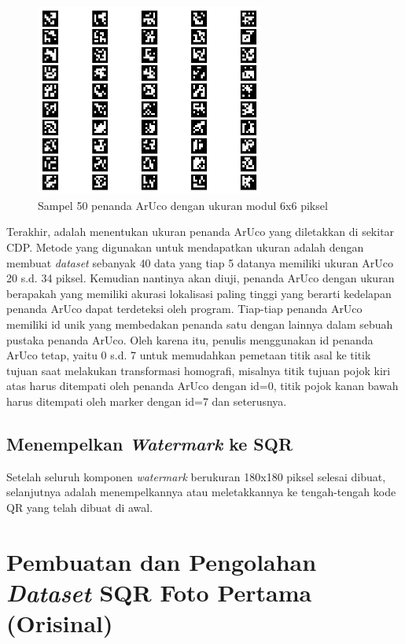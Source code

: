 \begin{figure}[h]
	\centering
	\includegraphics[width=7.5cm]{contents/chapter-3/3-aruco6x6.png}
	\caption{Sampel 50 penanda ArUco dengan ukuran modul 6x6 piksel}
	\label{Fig: 3-aruco6x6}
\end{figure}

Terakhir, adalah menentukan ukuran penanda ArUco yang diletakkan di sekitar CDP. Metode yang digunakan untuk mendapatkan ukuran adalah dengan membuat
\emph{dataset} sebanyak 40 data yang tiap 5 datanya memiliki ukuran ArUco 20 s.d. 34 piksel. Kemudian nantinya akan diuji, penanda ArUco dengan ukuran
berapakah yang memiliki akurasi lokalisasi paling tinggi yang berarti kedelapan penanda ArUco dapat terdeteksi oleh program. Tiap-tiap penanda ArUco memiliki
id unik yang membedakan penanda satu dengan lainnya dalam sebuah pustaka penanda ArUco. Oleh karena itu, penulis menggunakan id penanda ArUco tetap, yaitu 0
s.d. 7 untuk memudahkan pemetaan titik asal ke titik tujuan saat melakukan transformasi homografi, misalnya titik tujuan pojok kiri atas harus ditempati oleh
penanda ArUco dengan id=0, titik pojok kanan bawah harus ditempati oleh marker dengan id=7 dan seterusnya.

\subsection{Menempelkan \emph{Watermark} ke SQR} Setelah seluruh komponen \emph{watermark} berukuran 180x180 piksel selesai dibuat, selanjutnya adalah menempelkannya atau meletakkannya ke
tengah-tengah kode QR yang telah dibuat di awal.

\section{Pembuatan dan Pengolahan \emph{Dataset} SQR Foto Pertama (Orisinal)}
